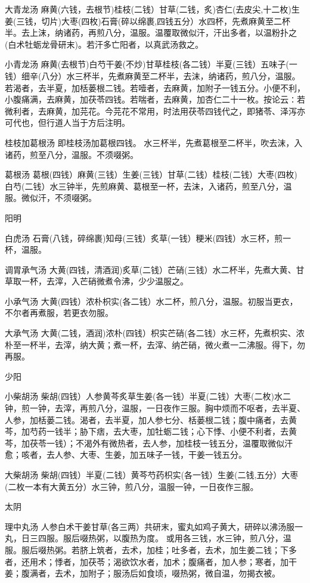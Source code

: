 \documentclass[a4paper,12pt,UTF8,twoside]{ctexbook}
\begin{document}
	大青龙汤
	麻黄(六钱，去根节)桂枝(二钱）甘草(二钱，炙)杏仁(去皮尖,十二枚)生姜(三钱，切片)大枣(四枚)石膏(碎以绵裹,四钱五分）水四杯，先煮麻黄至二杯半。去上沫，纳诸药，再煎八分，温服。温覆取微似汗，汗出多者，以温粉扑之(白术牡蛎龙骨研末)。若汗多亡阳者，以真武汤救之。
	
	小青龙汤
	麻黄(去根节)白芍干姜(不炒)甘草桂枝(各二钱）半夏(三钱）五味子(一钱）细辛(八分）水三杯半，先煮麻黄至二杯半，去沫，纳诸药，煎八分，温服。若渴者，去半夏，加栝蒌根二钱。若噎者，去麻黄，加附子一钱五分。小便不利，小腹痛满，去麻黄，加茯苓四钱。若喘者，去麻黄，加杏仁二十一枚。按论云∶若微利者，去麻黄，加芫花。今芫花不常用，时法用茯苓四钱代之，即猪苓、泽泻亦可代也，但行道人当于方后注明。
	
	桂枝加葛根汤
	即桂枝汤加葛根四钱。
	水三杯半，先煮葛根至二杯半，吹去沫，入诸药，煎至八分，温服。不须啜粥。
	
	葛根汤
	葛根(四钱）麻黄(三钱）生姜(三钱）甘草(二钱）桂枝(二钱）大枣(四枚)白芍(二钱）水三钟半，先煎麻黄、葛根至一杯，去沫，入诸药，煎至八分，温服。微似汗，不须啜粥。
	
	
	阳明	
	
	白虎汤
	石膏(八钱，碎绵裹)知母(三钱）炙草(一钱）粳米(四钱）水三杯，煎一杯，温服。
	
	调胃承气汤
	大黄(四钱，清酒润)炙草(二钱）芒硝(三钱）水二杯半，先煮大黄、甘草取一杯，去滓，入芒硝微煮令沸，少少温服之。
	
	小承气汤
	大黄(四钱）浓朴枳实(各二钱）水二杯，煎八分，温服。初服当更衣，不尔者再煮服，若更衣勿服。
	
	大承气汤
	大黄(二钱，酒润)浓朴(四钱）枳实芒硝(各二钱）水三杯，先煮枳实、浓朴至一杯半，去滓，纳大黄；煮一杯，去滓、纳芒硝，微火煮一二沸服。得下，勿再服。
	
	
	少阳	
	
	小柴胡汤
	柴胡(四钱）人参黄芩炙草生姜(各一钱）半夏(二钱）大枣(二枚)水二钟，煎一钟，去滓，再煎八分，温服，一日夜作三服。胸中烦而不呕者，去半夏、人参，加栝蒌二钱。渴者，去半夏，加人参七分、栝蒌根二钱；腹中痛者，去黄芩，加芍药一钱半；胁下痞，去大枣，加牡蛎二钱；心下悸、小便不利者，去黄芩，加茯苓一钱）；不渴外有微热者，去人参，加桂枝一钱五分，温覆取微似汗愈；咳者，去人参、大枣、生姜，加五味子一钱，干姜一钱五分。
	
	大柴胡汤
	柴胡(四钱）半夏(二钱）黄芩芍药枳实(各一钱）生姜(二钱,五分）大枣(二枚一本有大黄五分）水三钟，煎八分，温服一钟，一日夜作三服。
	
	
	太阴	
	
	理中丸汤
	人参白术干姜甘草(各三两）共研末，蜜丸如鸡子黄大，研碎以沸汤服一丸，日三四服。服后啜热粥，以腹热为度。
	或用各三钱，水三钟，煎八分，温服。服后啜热粥。若脐上筑者，去术，加桂；吐多者，去术，加生姜二钱；下多者，还用术；悸者，加茯苓；渴欲饮水者，加术；腹痛者，加人参；寒者，加干姜；腹满者，去术，加附子；服汤后如食顷，啜热粥，微自温，勿揭衣被。
	
\end{document}

